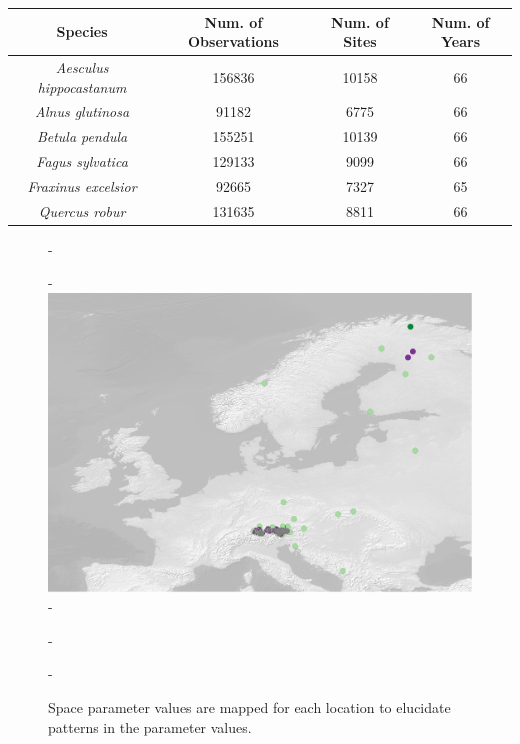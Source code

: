 \documentclass{article}\usepackage[]{graphicx}\usepackage[]{color}
\begin{document}
\begin{center}
 \label{tab:spp} 
\begin{tabular}{c c c c}
\hline
\textbf{Species} & \textbf{Num. of Observations} & \textbf{Num. of Sites} & \textbf{Num. of Years} \\
\hline
\textit{Aesculus hippocastanum} & 156836 & 10158 & 66  \\
\hline
\textit{Alnus glutinosa} & 91182 & 6775 & 66 \\
\hline
\textit{Betula pendula} & 155251 & 10139 & 66 \\
\hline
\textit{Fagus sylvatica} & 129133 & 9099 & 66 \\
\hline
\textit{Fraxinus excelsior} & 92665 & 7327 & 65 \\
\hline
\textit{Quercus robur} & 131635  & 8811 & 66 \\
\end{tabular}
\end{center}
  
{\begin{figure} [H]
  -\begin{center}
  -\includegraphics[width=12cm]{..//figures/space_extremes.pdf}
  -\caption{Space parameter values are mapped for each location to elucidate patterns in the parameter values.}\label{fig:space}
  -\end{center}
  -\end{figure}}
  
\end{document}
